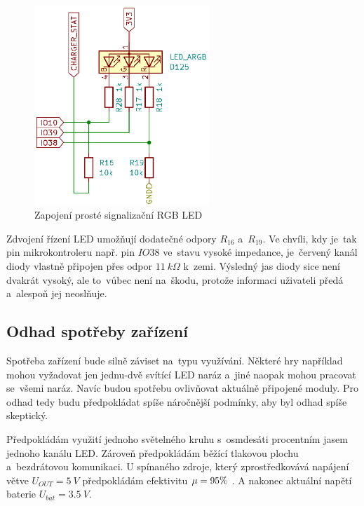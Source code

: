 \vspace{-3mm}
\begin{figure}[h!]
    \centering
    \includegraphics[angle=-90,width=0.585\textwidth]{text/PraktickaCast/img/RGB-LED.png}
    \caption{Zapojení prosté signalizační RGB LED}
    \label{fig:hloupa-LED}
\end{figure}
\vspace{-2mm}

Zdvojení řízení LED umožňují dodatečné odpory \(R_{16}\) a~\(R_{19}\).
Ve chvíli, kdy je~tak pin mikrokontroleru např. pin \(IO38\) ve~stavu vysoké impedance, je~červený kanál diody vlastně připojen přes odpor \(11~k\Omega\) k~zemi.
Výsledný jas diody sice není dvakrát vysoký, ale to~vůbec není na~škodu, protože informaci uživateli předá a~alespoň jej neoslňuje.

\subsection{Odhad spotřeby zařízení}
Spotřeba zařízení bude silně záviset na~typu využívání.
Některé hry například mohou vyžadovat jen jednu-dvě svítící LED naráz a~jiné naopak mohou pracovat se~všemi naráz.
Navíc budou spotřebu ovlivňovat aktuálně připojené moduly.
Pro odhad tedy budu předpokládat spíše náročnější podmínky, aby byl odhad spíše skeptický.

Předpokládám využití jednoho světelného kruhu s~osmdesáti procentním jasem jednoho kanálu LED.
Zároveň předpokládám běžící tlakovou plochu a~bezdrátovou komunikaci.
U spínaného zdroje, který zprostředkovává napájení větve \(U_{OUT} = 5~V\) předpokládám efektivitu \(\mu = 95\-\%\) \cite{TPS61088}.
A nakonec aktuální napětí baterie \(U_{bat} = 3.5~V\). 

